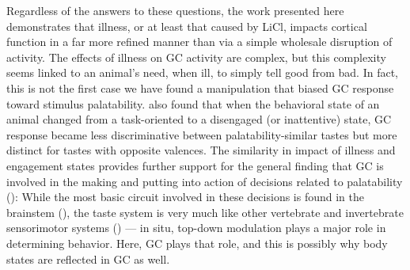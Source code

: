 \begin{refsection}
Regardless of the answers to these questions, the work presented here demonstrates that illness, or at least that caused by LiCl, impacts cortical function in a far more refined manner than via a simple wholesale disruption of activity. The effects of illness on GC activity are complex, but this complexity seems linked to an animal’s need, when ill, to simply tell good from bad. In fact, this is not the first case we have found a manipulation that biased GC response toward stimulus palatability. \cite{fontanini2006a} also found that when the behavioral state of an animal changed from a task-oriented to a disengaged (or inattentive) state, GC response became less discriminative between palatability-similar tastes but more distinct for tastes with opposite valences. The similarity in impact of illness and engagement states provides further support for the general finding that GC is involved in the making and putting into action of decisions related to palatability (\cite{sadacca2016a,mukherjee2019a}): While the most basic circuit involved in these decisions is found in the brainstem (\cite{grill1978a,grill1978b,geran2006a}), the taste system is very much like other vertebrate and invertebrate sensorimotor systems (\cite{geran2006a}) --- in situ, top-down modulation plays a major role in determining behavior. Here, GC plays that role, and this is possibly why body states are reflected in GC as well.

\printbibliography[title={References}]

\end{refsection}